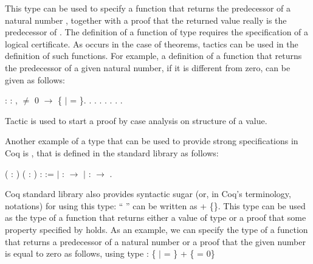 \coqdocemptyline
This type can be used to specify a function that returns the
predecessor of a natural number , together with a proof that
the returned value really is the predecessor of . The
definition of a function of type  requires the specification
of a logical certificate. As occurs in the case of theorems, tactics
can be used in the definition of such functions. For example, a
definition of a function that returns the predecessor of a given
natural number, if it is different from zero, can be given as follows:
 \begin{coqdoccode}
\coqdocemptyline
\coqdocnoindent
{}  : \coqdockw{\ensuremath{\forall}}  : ,  \ensuremath{\not=} 0 \ensuremath{\rightarrow} \{ \ensuremath{|}  =  \}.\coqdoceol
\coqdocindent{1.50em}
  .\coqdoceol
\coqdocindent{1.50em}
 .\coqdoceol
\coqdocindent{1.50em}
 . .\coqdoceol
\coqdocindent{1.50em}
\coqdoctac{\ensuremath{\exists}} . .\coqdoceol
\coqdocnoindent
{}.\coqdoceol
\coqdocemptyline
\end{coqdoccode}
Tactic  is used to start a proof by case analysis on
structure of a value.


Another example of a type that can be used to provide strong
specifications in Coq is , that is defined in the
standard library as follows:
 \begin{coqdoccode}
\coqdocemptyline
\coqdocnoindent
{} ( : ) ( : ) :  :=\coqdoceol
\coqdocnoindent
\ensuremath{|}  :  \ensuremath{\rightarrow}   \coqdoceol
\coqdocnoindent
\ensuremath{|}  :  \ensuremath{\rightarrow}   .\coqdoceol
\coqdocemptyline
\end{coqdoccode}
Coq standard library also provides syntactic sugar (or, in Coq's
terminology, notations) for using this type: ``  '' can
be written as  + \{\}.
This type can be used as the type of a function that returns either a
value of type  or a proof that some property specified by
 holds.
As an example, we can specify the type of a function that returns a
predecessor of a natural number or a proof that the given number is
equal to zero as follows, using type :
\coqdoceol
\coqdocemptyline
\coqdocnoindent
\{ \ensuremath{|}  =  \} + \{ = 0\}

